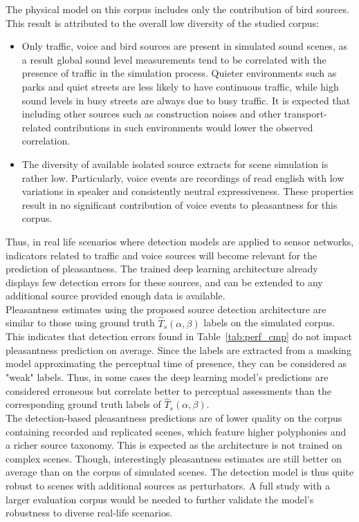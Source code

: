 \documentclass[11pt,a4paper]{article}
\begin{document}
The physical model on this corpus includes only the contribution of bird sources. This result is attributed to the overall low diversity of the studied corpus:
\begin{itemize}
\item Only traffic, voice and bird sources are present in simulated sound scenes, as a result global sound level measurements tend to be correlated with the presence of traffic in the simulation process. Quieter environments such as parks and quiet streets are less likely to have continuous traffic, while high sound levels in busy streets are always due to busy traffic. It is expected that including other sources such as construction noises and other transport-related contributions in such environments would lower the observed correlation.
\item The diversity of available isolated source extracts for scene simulation is rather low. Particularly, voice events are recordings of read english with low variations in speaker and consistently neutral expressiveness. These properties result in no significant contribution of voice events to pleasantness for this corpus.
\end{itemize}
Thus, in real life scenarios where detection models are applied to sensor networks, indicators related to traffic and voice sources will become relevant for the prediction of pleasantness. The trained deep learning architecture already displays few detection errors for these sources, and can be extended to any additional source provided enough data is available.\\

Pleasantness estimates using the proposed source detection architecture are similar to those using ground truth $\hat T_s(\alpha, \beta)$ labels on the simulated corpus. This indicates that detection errors found in Table~\ref{tab:perf_cmp} do not impact pleasantness prediction on average. Since the labels are extracted from a masking model approximating the perceptual time of presence, they can be considered as "weak" labels. Thus, in some cases the deep learning model's predictions are considered erroneous but correlate better to perceptual assessments than the corresponding ground truth labels of $\hat T_s(\alpha, \beta)$.\\

The detection-based pleasantness predictions are of lower quality on the corpus containing recorded and replicated scenes, which feature higher polyphonies and a richer source taxonomy. This is expected as the architecture is not trained on complex scenes. Though, interestingly pleasantness estimates are still better on average than on the corpus of simulated scenes. The detection model is thus quite robust to scenes with additional sources as perturbators. A full study with a larger evaluation corpus would be needed to further validate the model's robustness to diverse real-life scenarios.
\end{document}

